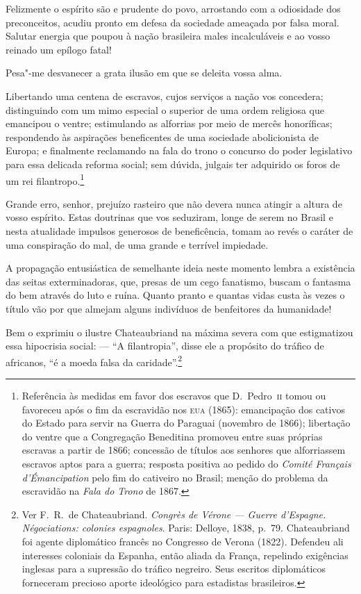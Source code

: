 Felizmente o espírito são e prudente do povo, arrostando com a
odiosidade dos preconceitos, acudiu pronto em defesa da sociedade
ameaçada por falsa moral. Salutar energia que poupou à nação brasileira
males incalculáveis e ao vosso reinado um epílogo fatal! 

Pesa"-me desvanecer a grata ilusão em que se deleita vossa alma. 

Libertando uma centena de escravos, cujos serviços a nação vos
concedera; distinguindo com um mimo especial o superior de uma ordem
religiosa que emancipou o ventre; estimulando as alforrias por meio de
mercês honoríficas; respondendo às aspirações beneficentes de uma \EP[-1]%
sociedade abolicionista de Europa; e finalmente reclamando na fala do
trono o concurso do poder legislativo para essa delicada reforma  
social; sem dúvida, julgais ter adquirido os foros de um rei
filantropo.\footnote{ Referência às medidas em favor dos escravos que D.~Pedro~\textsc{ii} 
tomou ou favoreceu após o fim da escravidão nos \textsc{eua} (1865): emancipação dos cativos 
do Estado para servir na Guerra do Paraguai (novembro de 1866); libertação do ventre que a 
Congregação Beneditina promoveu entre suas próprias escravas a partir de 1866; concessão de 
títulos aos senhores que alforriassem escravos aptos para a guerra; resposta positiva ao 
pedido do \textit{Comité Français d'Émancipation} pelo fim do cativeiro no Brasil; 
menção do problema da escravidão na \textit{Fala do Trono} de 1867.} 
 
Grande erro, senhor, prejuízo rasteiro que não devera nunca atingir a 
altura de vosso espírito. Estas doutrinas que vos seduziram, longe de
serem no Brasil e nesta atualidade impulsos generosos de beneficência,
tomam ao revés o caráter de uma conspiração do mal, de uma grande e
terrível impiedade.

A propagação entusiástica de semelhante ideia neste momento lembra a
existência das seitas exterminadoras, que, presas de um cego fanatismo,
buscam o fantasma do bem através do luto e ruína. Quanto pranto e
quantas vidas custa às vezes o título vão por que almejam alguns
indivíduos de benfeitores da humanidade!

Bem o exprimiu o ilustre Chateaubriand na máxima severa com que
estigmatizou essa hipocrisia social: --- ``A filantropia'', disse ele a
propósito do tráfico de africanos, ``é a moeda falsa da
caridade''.\footnote{ Ver F.~R.~de Chateaubriand. \textit{Congrès de Vérone --- 
Guerre d'Espagne. Négociations: colonies espagnoles}. Paris: Delloye, 1838, p.~79. 
Chateaubriand foi agente diplomático francês no Congresso 
de Verona (1822). Defendeu ali interesses coloniais da Espanha, então aliada da França, 
repelindo exigências inglesas para a supressão do tráfico negreiro. Seus escritos 
diplomáticos forneceram precioso aporte ideológico para estadistas brasileiros.}

